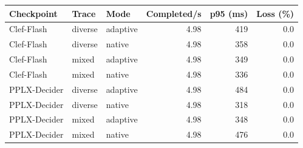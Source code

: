 \begin{tabular}{lllrrr}
\toprule
Checkpoint & Trace & Mode & Completed/s & p95 (ms) & Loss (\%) \\
\midrule
Clef-Flash & diverse & adaptive & 4.98 & 419 & 0.0 \\
Clef-Flash & diverse & native & 4.98 & 358 & 0.0 \\
Clef-Flash & mixed & adaptive & 4.98 & 349 & 0.0 \\
Clef-Flash & mixed & native & 4.98 & 336 & 0.0 \\
PPLX-Decider & diverse & adaptive & 4.98 & 484 & 0.0 \\
PPLX-Decider & diverse & native & 4.98 & 318 & 0.0 \\
PPLX-Decider & mixed & adaptive & 4.98 & 348 & 0.0 \\
PPLX-Decider & mixed & native & 4.98 & 476 & 0.0 \\
\bottomrule
\end{tabular}

